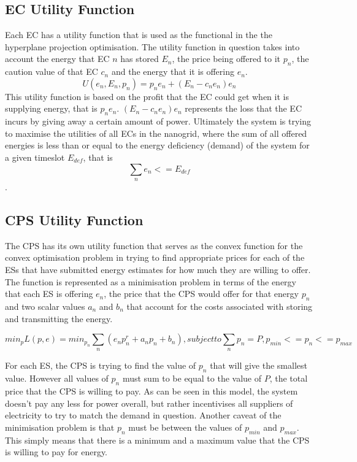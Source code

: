 \documentclass[a4paper, notitlepage]{report}
\begin{document}
\subsection{EC Utility Function}
\label{sec:org94dcbd5}
Each EC has a utility function that is used as the functional in the the
hyperplane projection optimisation. The utility function in question takes into
account the energy that EC \(n\) has stored \(E_n\), the price being offered to it
\(p_n\), the caution value of that EC \(c_n\) and the energy that it is offering \(e_n\).
$$ U(e_n, E_n, p_n) = p_{n}e_{n} + (E_{n} - c_{n}e_{n})e_{n} $$ 
This utility function is based on the profit that the EC could get when it is
supplying energy, that is \(p_{n}e_{n}\). \((E_{n} - c_{n}e_{n})e_{n}\) represents the loss that the
EC incurs by giving away a certain amount of power. Ultimately the system is
trying to maximise the utilities of all ECs in the nanogrid, where the sum of
all offered energies is less than or equal to the energy deficiency (demand) of the
system for a given timeslot \(E_{def}\), that is $$\sum_n e_n <= E_{def}$$.
\subsection{CPS Utility Function}
\label{sec:org86308a6}
The CPS has its own utility function that serves as the convex function for the
convex optimisation problem in trying to find appropriate prices for each of the
ESs that have submitted energy estimates for how much they are willing to offer.
The function is represented as a minimisation problem in terms of the energy
that each ES is offering \(e_n\), the price that the CPS would offer for that
energy \(p_n\) and two scalar values \(a_n\) and \(b_n\)  that account for the costs
associated with storing and transmitting the energy.

$$min_p L(p,e) = min_{p_{n}} \sum_n(e_{n}p_n^r + a_{n}p_{n} + b_n), subject to \sum_n p_n = P, p_{min}
<= p_n <= p_{max}$$

For each ES, the CPS is trying to find the value of \(p_n\) that will give the
smallest value. However all values of \(p_n\) must sum to be equal to the value of
\(P\), the total price that the CPS is willing to pay. As can be seen in this
model, the system doesn't pay any less for power overall, but rather
incentivises all suppliers of electricity to try to match the demand in
question. Another caveat of the minimisation problem is that \(p_n\) must be
between the values of \(p_{min}\) and \(p_{max}\). This simply means that there is a
minimum and a maximum value that the CPS is willing to pay for energy.
\end{document}
